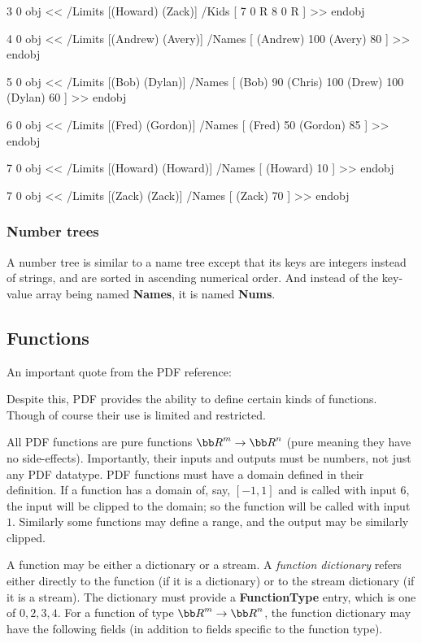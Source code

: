 3 0 obj     %
<<
    /Limits [(Howard) (Zack)]
    /Kids
      [ 7 0 R
        8 0 R ]
>>
endobj

4 0 obj     %
<<
    /Limits [(Andrew) (Avery)]
    /Names
      [ (Andrew) 100
        (Avery) 80 ]
>>
endobj

5 0 obj     %
<<
    /Limits [(Bob) (Dylan)]
    /Names
      [ (Bob) 90
        (Chris) 100
        (Drew) 100
        (Dylan) 60 ]
>>
endobj

6 0 obj     %
<<
    /Limits [(Fred) (Gordon)]
    /Names
      [ (Fred) 50
        (Gordon) 85 ]
>>
endobj

7 0 obj     %
<<
    /Limits [(Howard) (Howard)]
    /Names
      [ (Howard) 10 ]
>>
endobj

7 0 obj     %
<<
    /Limits [(Zack) (Zack)]
    /Names
      [ (Zack) 70 ]
>>
endobj
\elisting

\subsubsection{Number trees}

A number tree is similar to a name tree except that its keys are integers instead of strings, and are
sorted in ascending numerical order.
And instead of the key-value array being named {\bf Names}, it is named {\bf Nums}.

\subsection{Functions}

An important quote from the PDF reference:


Despite this, PDF provides the ability to define certain kinds of functions.
Though of course their use is limited and restricted.

All PDF functions are pure functions ${\bb R}^m\to{\bb R}^n$ (pure meaning they have no side-effects).
Importantly, their inputs and outputs must be numbers, not just any PDF datatype.
PDF functions must have a domain defined in their definition.
If a function has a domain of, say, $[-1,1]$ and is called with input $6$, the input will be clipped to the
domain; so the function will be called with input $1$.
Similarly some functions may define a range, and the output may be similarly clipped.

A function may be either a dictionary or a stream.
A {\it function dictionary} refers either directly to the function (if it is a dictionary) or to the stream
dictionary (if it is a stream).
The dictionary must provide a {\bf FunctionType} entry, which is one of $0,2,3,4$.
For a function of type ${\bb R}^m\to{\bb R}^n$, the function dictionary may have the following fields
(in addition to fields specific to the function type).

